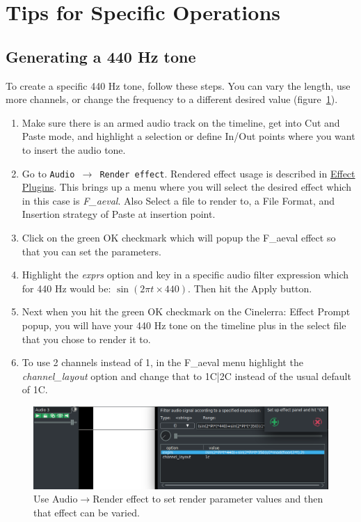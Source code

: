 \section{Tips for Specific Operations}%
\label{sec:tips_specific_operations}

\subsection{Generating a 440 Hz tone}%
\label{sub:generating_440_tone}

To create a specific 440 Hz tone, follow these steps.  You can vary the length, use more channels, or change the frequency to a different desired value (figure~\ref{fig:aeval}).

\begin{enumerate}
	\item Make sure there is an armed audio track on the timeline, get into Cut and Paste mode, and highlight
	a selection or define In/Out points where you want to insert the audio tone.
	\item Go to \texttt{Audio $\rightarrow$ Render effect}.  Rendered effect usage is described in \hyperref[sec:rendered_effects]{Effect Plugins}. This brings up a menu where you will select the desired effect which in this case is \textit{F\_aeval}.  Also Select a file to render to, a File Format, and Insertion strategy of Paste at insertion point.
	\item Click on the green OK checkmark which will popup the F\_aeval effect so that you can set the
	parameters.
	\item Highlight the \textit{exprs} option and key in a specific audio filter expression which for 440 Hz would be:
	$\sin(2\pi t\times440)$.  Then hit the Apply button.
	\item Next when you hit the green OK checkmark on the Cinelerra: Effect Prompt popup, you will have
	your 440 Hz tone on the timeline plus in the select file that you chose to render it to.
	\item To use 2 channels instead of 1, in the F\_aeval menu highlight the \textit{channel\_layout} option and change
	that to 1C|2C instead of the usual default of 1C.
\end{enumerate}

\begin{figure}[htpb]
	\centering
	\includegraphics[width=1.0\linewidth]{images/aeval.png}
	\caption{Use Audio$\rightarrow$Render effect to set render parameter values and then that effect can be varied.}
	\label{fig:aeval}
\end{figure}

